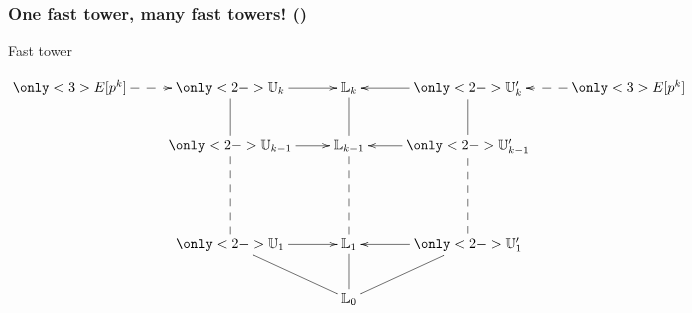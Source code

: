 \documentclass[10pt,usepdftitle=false]{beamer}
\begin{document}

\begin{frame}
  \frametitle{One fast tower, many fast towers! (\cite{couveignes00})}

  \begin{center}
    Fast tower

    \bigskip

    \Large$\xymatrix{
      \only<3>{E[p^k]\ar@{-->}[r]} & \only<2->{\U_k \ar@{-}[d]\ar[r]}      & \LK_k \ar@{-}[d]      & \only<2->{\U_k' \ar@{-}[d]\ar[l]}& \only<3>{E[p^k]\ar@{-->}[l]}\\
      &\only<2->{\U_{k-1} \ar@{--}[dd]\ar[r]} & \LK_{k-1} \ar@{--}[dd] & \only<2->{\U_{k-1}' \ar@{--}[dd]\ar[l]}\\
      \\
      &\only<2->{\U_1 \ar@{-}[dr]\ar[r]}     & \LK_1 \ar@{-}[d]      & \only<2->{\U_1' \ar@{-}[dl]\ar[l]}\\
      &                    &\LK_0
    }$
  \end{center}
\end{frame}

\end{document}
